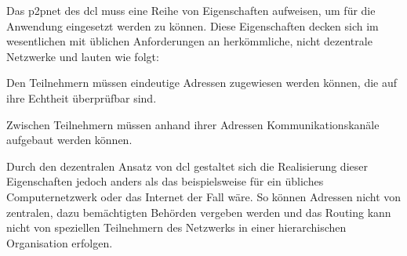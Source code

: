 
Das \gls{p2pnet} des \gls{dcl} muss eine Reihe von Eigenschaften aufweisen,
um für die Anwendung eingesetzt werden zu können. Diese Eigenschaften decken sich im wesentlichen mit
üblichen Anforderungen an herkömmliche, nicht dezentrale Netzwerke und lauten wie folgt:
\begin{description}
		
		Den Teilnehmern müssen eindeutige Adressen zugewiesen werden können, die auf ihre Echtheit überprüfbar sind.
	
	
		
		Zwischen Teilnehmern müssen anhand ihrer Adressen Kommunikationskanäle aufgebaut werden können.

\end{description}

Durch den dezentralen Ansatz von \gls{dcl} gestaltet sich die Realisierung dieser Eigenschaften jedoch
anders als das beispielsweise für ein übliches Computernetzwerk oder das Internet der Fall wäre.
So können Adressen nicht von zentralen, dazu bemächtigten Behörden vergeben werden und das Routing
kann nicht von speziellen Teilnehmern des Netzwerks in einer hierarchischen Organisation erfolgen.

